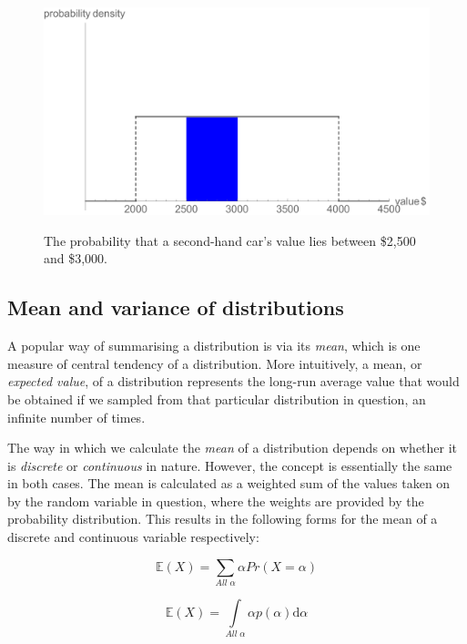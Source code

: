 \documentclass[11pt,fullpage]{book}
\begin{document}
\begin{figure}
\centering
\scalebox{0.5} 
{\includegraphics{Intro_continuousLotteryInterval.pdf}}
\caption{The probability that a second-hand car's value lies between \$2,500 and \$3,000.}\label{fig:Intro_continuousLotteryInterval}
\end{figure}

\subsection{Mean and variance of distributions}
A popular way of summarising a distribution is via its \textit{mean}, which is one measure of central tendency of a distribution. More intuitively, a mean, or \textit{expected value}, of a distribution represents the long-run average value that would be obtained if we sampled from that particular distribution in question, an infinite number of times. 

The way in which we calculate the \textit{mean} of a distribution depends on whether it is \textit{discrete} or \textit{continuous} in nature. However, the concept is essentially the same in both cases. The mean is calculated as a weighted sum of the values taken on by the random variable in question, where the weights are provided by the probability distribution. This results in the following forms for the mean of a discrete and continuous variable respectively:

\begin{equation}\label{eq:Intro_meanDistributionDiscrete}
\mathbb{E}(X) = \sum\limits_{All\; \alpha} \alpha Pr(X=\alpha)
\end{equation}

\begin{equation}\label{eq:Intro_meanDistributionContinuous}
\mathbb{E}(X) = \int\limits_{All\; \alpha} \alpha p(\alpha)\mathrm{d}\alpha
\end{equation}
\end{document}
